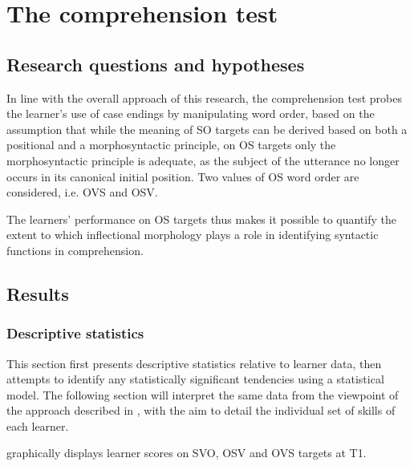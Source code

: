 \chapter{The comprehension test}\label{sec:4}

\section{Research questions and hypotheses}\label{sec:05:1}

In line with the overall approach of this research, the comprehension test probes the learner's use of case endings by manipulating word order, based on the assumption that while the meaning of SO targets can be derived based on both a positional and a morphosyntactic principle, on OS targets only the morphosyntactic principle is adequate, as the subject of the utterance no longer occurs in its canonical initial position. Two values of OS word order are considered, i.e. OVS and OSV.

The learners’ performance on OS targets thus makes it possible to quantify the extent to which inflectional morphology plays a role in identifying syntactic functions in comprehension.

\section{Results}\label{sec:05:2}
\subsection{Descriptive statistics}\label{sec:05:2.1}

This section first presents descriptive statistics relative to learner data, then attempts to identify any statistically significant tendencies using a statistical model. The following section will interpret the same data from the viewpoint of the approach described in , with the aim to detail the individual set of skills of each learner.

 graphically displays learner scores on SVO, OSV and OVS targets at T1.

